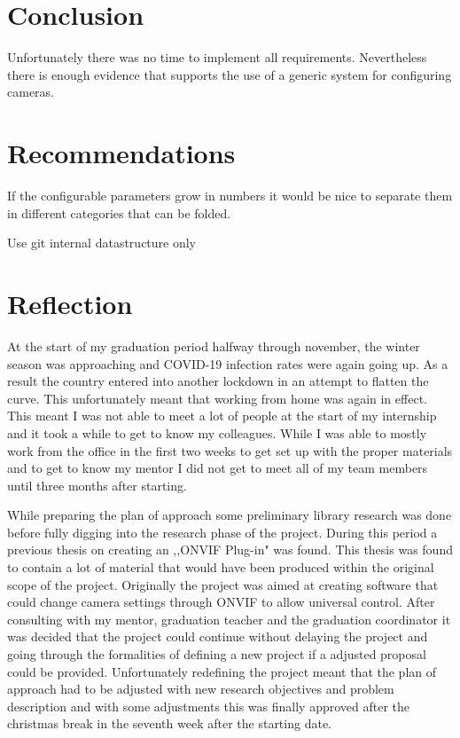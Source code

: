 \chapter{Conclusion}
Unfortunately there was no time to implement all requirements.
Nevertheless there is enough evidence that supports the use of a generic system for configuring cameras.

\chapter{Recommendations}
If the configurable parameters grow in numbers it would be nice to separate them in different categories that can be folded.

Use git internal datastructure only

\chapter{Reflection}
At the start of my graduation period halfway through november, the winter season was approaching and COVID-19 infection rates were again going up.
As a result the country entered into another lockdown in an attempt to flatten the curve.
This unfortunately meant that working from home was again in effect.
This meant I was not able to meet a lot of people at the start of my internship and it took a while to get to know my colleagues.
While I was able to mostly work from the office in the first two weeks to get set up with the proper materials and to get to know my mentor I did not get to meet all of my team members until three months after starting.

While preparing the plan of approach some preliminary library research was done before fully digging into the research phase of the project.
During this period a previous thesis on creating an ,,ONVIF Plug-in" \cite{kesteloo_onvif_2016} was found.
This thesis was found to contain a lot of material that would have been produced within the original scope of the project.
Originally the project was aimed at creating software that could change camera settings through ONVIF to allow universal control.
After consulting with my mentor, graduation teacher and the graduation coordinator it was decided that the project could continue without delaying the project and going through the formalities of defining a new project if a adjusted proposal could be provided.
Unfortunately redefining the project meant that the plan of approach had to be adjusted with new research objectives and problem description and with some adjustments this was finally approved after the christmas break in the seventh week after the starting date.

